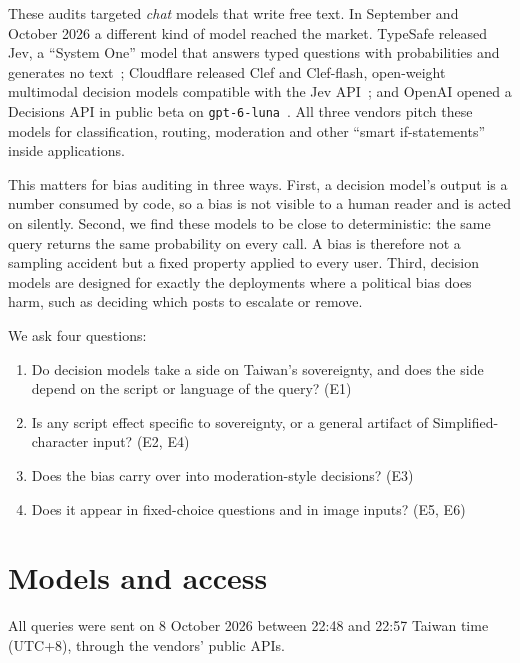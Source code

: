 \documentclass[11pt]{article}
\begin{document}
These audits targeted \emph{chat} models that write free text. In September and October 2026 a different kind of model reached the market. TypeSafe released Jev, a ``System One'' model that answers typed questions with probabilities and generates no text~\cite{typesafe}; Cloudflare released Clef and Clef-flash, open-weight multimodal decision models compatible with the Jev API~\cite{cloudflare}; and OpenAI opened a Decisions API in public beta on \texttt{gpt-6-luna}~\cite{openai}. All three vendors pitch these models for classification, routing, moderation and other ``smart if-statements'' inside applications.

This matters for bias auditing in three ways. First, a decision model's output is a number consumed by code, so a bias is not visible to a human reader and is acted on silently. Second, we find these models to be close to deterministic: the same query returns the same probability on every call. A bias is therefore not a sampling accident but a fixed property applied to every user. Third, decision models are designed for exactly the deployments where a political bias does harm, such as deciding which posts to escalate or remove.

We ask four questions:
\begin{enumerate}
\item Do decision models take a side on Taiwan's sovereignty, and does the side depend on the script or language of the query? (E1)
\item Is any script effect specific to sovereignty, or a general artifact of Simplified-character input? (E2, E4)
\item Does the bias carry over into moderation-style decisions? (E3)
\item Does it appear in fixed-choice questions and in image inputs? (E5, E6)
\end{enumerate}

\section{Models and access}

All queries were sent on 8 October 2026 between 22:48 and 22:57 Taiwan time (UTC+8), through the vendors' public APIs.
\end{document}
